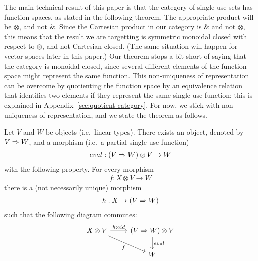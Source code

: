  
The main technical result of this paper is that the category of single-use sets has function spaces, as stated in the following theorem.  The appropriate product will be $\otimes$, and not $\&$. Since the Cartesian product in our category is $\&$ and not $\otimes$, this means that the result we are targetting is symmetric monoidal closed with respect to $\otimes$, and not Cartesian closed. (The same situation will happen  for vector spaces later in this paper.)  Our theorem stops a bit short of saying that the category is monoidal closed, since several different elements of the function space might represent the same function. This non-uniqueness of representation can be overcome  by quotienting the function space  by an equivalence relation that identifies two elements if they represent the same single-use function; this is explained in Appendix~\ref{sec:quotient-category}. For now, we stick with non-uniqueness of representation, and we state the theorem as follows.

\begin{theorem}\label{thm:single-use-closed}
    Let $V$ and $W$ be objects (i.e.~linear types). There exists an object, denoted by  $V \Rightarrow W$, and a morphism (i.e.~a partial single-use function)
    \begin{align*}
    eval : (V \Rightarrow W) \otimes V \to  W
    \end{align*}
    with the following property. For every morphism
    \begin{align*}
    f : {X \otimes V} \to  W
    \end{align*}
    there is a (not necessarily unique) morphism
    \begin{align*}
    h :  X \to (V \Rightarrow W)
    \end{align*}
    such that the following diagram commutes:
    \[
    \begin{tikzcd}
    X \otimes V 
    \arrow[r,"h \otimes id"]
    \arrow[dr,"f"']
    &
    (\funspace V W) \otimes V
    \arrow[d,"eval"] \\
    &
    W
    \end{tikzcd}
    \]
\end{theorem}

